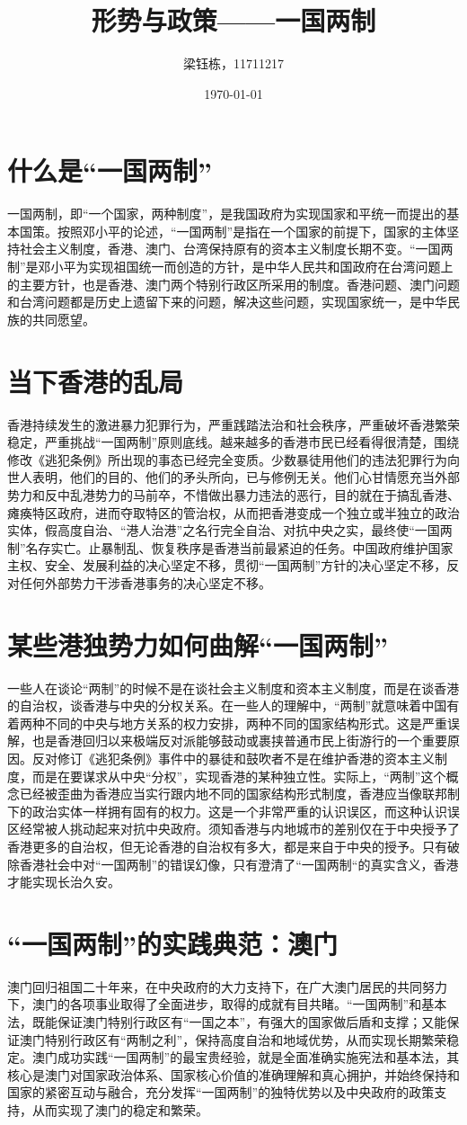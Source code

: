 \documentclass{ctexart}
\title{形势与政策——一国两制}
\author{梁钰栋，11711217}
\date{\today}
\begin{document}
\maketitle

\section{什么是“一国两制”}
一国两制，即“一个国家，两种制度”，是我国政府为实现国家和平统一而提出的基本国策。按照邓小平的论述，“一国两制”是指在一个国家的前提下，国家的主体坚持社会主义制度，香港、澳门、台湾保持原有的资本主义制度长期不变。“一国两制”是邓小平为实现祖国统一而创造的方针，是中华人民共和国政府在台湾问题上的主要方针，也是香港、澳门两个特别行政区所采用的制度。香港问题、澳门问题和台湾问题都是历史上遗留下来的问题，解决这些问题，实现国家统一，是中华民族的共同愿望。

\section{当下香港的乱局}
香港持续发生的激进暴力犯罪行为，严重践踏法治和社会秩序，严重破坏香港繁荣稳定，严重挑战“一国两制”原则底线。越来越多的香港市民已经看得很清楚，围绕修改《逃犯条例》所出现的事态已经完全变质。少数暴徒用他们的违法犯罪行为向世人表明，他们的目的、他们的矛头所向，已与修例无关。他们心甘情愿充当外部势力和反中乱港势力的马前卒，不惜做出暴力违法的恶行，目的就在于搞乱香港、瘫痪特区政府，进而夺取特区的管治权，从而把香港变成一个独立或半独立的政治实体，假高度自治、“港人治港”之名行完全自治、对抗中央之实，最终使“一国两制”名存实亡。止暴制乱、恢复秩序是香港当前最紧迫的任务。中国政府维护国家主权、安全、发展利益的决心坚定不移，贯彻“一国两制”方针的决心坚定不移，反对任何外部势力干涉香港事务的决心坚定不移。

\section{某些港独势力如何曲解“一国两制”}
一些人在谈论“两制”的时候不是在谈社会主义制度和资本主义制度，而是在谈香港的自治权，谈香港与中央的分权关系。在一些人的理解中，“两制”就意味着中国有着两种不同的中央与地方关系的权力安排，两种不同的国家结构形式。这是严重误解，也是香港回归以来极端反对派能够鼓动或裹挟普通市民上街游行的一个重要原因。反对修订《逃犯条例》事件中的暴徒和鼓吹者不是在维护香港的资本主义制度，而是在要谋求从中央“分权”，实现香港的某种独立性。实际上，“两制”这个概念已经被歪曲为香港应当实行跟内地不同的国家结构形式制度，香港应当像联邦制下的政治实体一样拥有固有的权力。这是一个非常严重的认识误区，而这种认识误区经常被人挑动起来对抗中央政府。须知香港与内地城市的差别仅在于中央授予了香港更多的自治权，但无论香港的自治权有多大，都是来自于中央的授予。只有破除香港社会中对“一国两制”的错误幻像，只有澄清了“一国两制“的真实含义，香港才能实现长治久安。

\section{“一国两制”的实践典范：澳门}
澳门回归祖国二十年来，在中央政府的大力支持下，在广大澳门居民的共同努力下，澳门的各项事业取得了全面进步，取得的成就有目共睹。“一国两制”和基本法，既能保证澳门特别行政区有“一国之本”，有强大的国家做后盾和支撑；又能保证澳门特别行政区有“两制之利”，保持高度自治和地域优势，从而实现长期繁荣稳定。澳门成功实践“一国两制”的最宝贵经验，就是全面准确实施宪法和基本法，其核心是澳门对国家政治体系、国家核心价值的准确理解和真心拥护，并始终保持和国家的紧密互动与融合，充分发挥“一国两制”的独特优势以及中央政府的政策支持，从而实现了澳门的稳定和繁荣。
\end{document}
